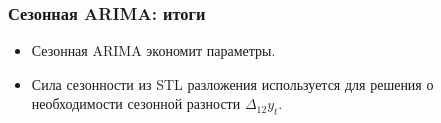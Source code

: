 \begin{frame}
  \frametitle{Сезонная ARIMA: итоги}
  \begin{itemize}[<+->]
  \item Сезонная ARIMA \alert{экономит} параметры.
  \item Сила сезонности из \alert{STL} разложения используется для решения о необходимости сезонной разности $\Delta_12 y_t$.
  \end{itemize}
\end{frame}



